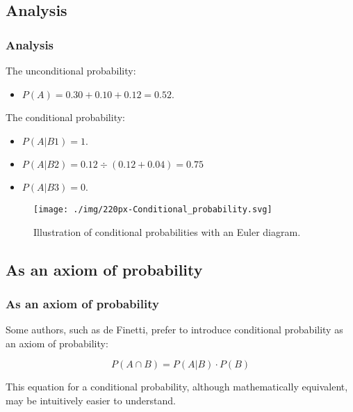 \subsection{Analysis}\label{subsec:analysis2}
\begin{frame}
    \frametitle{Analysis}
    The unconditional probability:
    \begin{itemize}
        \item $P(A) = 0.30 + 0.10 + 0.12 = 0.52$.
    \end{itemize}
    The conditional probability:
    \begin{itemize}
        \item $P(A|B1) = 1$.
        \item $P(A|B2) = 0.12 \div (0.12 + 0.04) = 0.75$
        \item $P(A|B3) = 0$.
    \end{itemize}
    \begin{figure}[h]
        \centering
        \texttt{[image: ./img/220px-Conditional\_probability.svg]}
        \caption{Illustration of conditional probabilities with an Euler diagram.}
        \label{fig:example2}
    \end{figure}
\end{frame}

\subsection{As an axiom of probability}\label{subsec:axiom}
\begin{frame}
    \frametitle{As an axiom of probability}
    Some authors, such as de Finetti, prefer to introduce conditional probability as an axiom of probability:
    \begin{block}{}
        \begin{equation}
            P(A \cap B) = P(A|B) \cdot P(B)\label{eq:equation22}
        \end{equation}
    \end{block}
    This equation for a conditional probability, although mathematically equivalent, may be intuitively easier to understand.
\end{frame}
